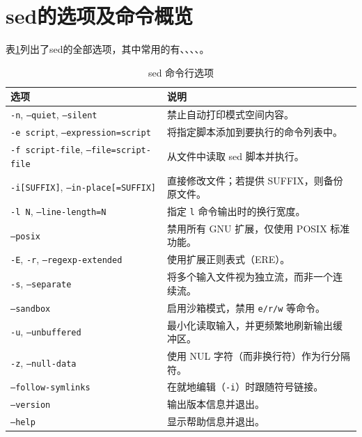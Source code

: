 \section{sed的选项及命令概览}
表\ref{tab:sed-options}列出了sed的全部选项，其中常用的有、、、、。
\begin{table}[htbp]
	\centering
	\footnotesize
	\begin{tabular}{l l}
		\toprule
		\textbf{选项}                                        & \textbf{说明}                               \\\midrule
		\texttt{-n}, \texttt{--quiet}, \texttt{--silent}     & 禁止自动打印模式空间内容。                  \\
		\texttt{-e script}, \texttt{--expression=script}     & 将指定脚本添加到要执行的命令列表中。        \\
		\texttt{-f script-file}, \texttt{--file=script-file} & 从文件中读取 sed 脚本并执行。               \\
		\texttt{-i[SUFFIX]}, \texttt{--in-place[=SUFFIX]}    & 直接修改文件；若提供 SUFFIX，则备份原文件。 \\
		\texttt{-l N}, \texttt{--line-length=N}              & 指定 \texttt{l} 命令输出时的换行宽度。      \\
		\texttt{--posix}                                     & 禁用所有 GNU 扩展，仅使用 POSIX 标准功能。  \\
		\texttt{-E}, \texttt{-r}, \texttt{--regexp-extended} & 使用扩展正则表式（ERE）。                   \\
		\texttt{-s}, \texttt{--separate}                     & 将多个输入文件视为独立流，而非一个连续流。  \\
		\texttt{--sandbox}                                   & 启用沙箱模式，禁用 \texttt{e/r/w} 等命令。  \\
		\texttt{-u}, \texttt{--unbuffered}                   & 最小化读取输入，并更频繁地刷新输出缓冲区。  \\
		\texttt{-z}, \texttt{--null-data}                    & 使用 NUL 字符（而非换行符）作为行分隔符。   \\
		\texttt{--follow-symlinks}                           & 在就地编辑（\texttt{-i}）时跟随符号链接。   \\
		\texttt{--version}                                   & 输出版本信息并退出。                        \\
		\texttt{--help}                                      & 显示帮助信息并退出。                        \\
		\bottomrule
	\end{tabular}
	\caption{sed 命令行选项}
	\label{tab:sed-options}
\end{table}


